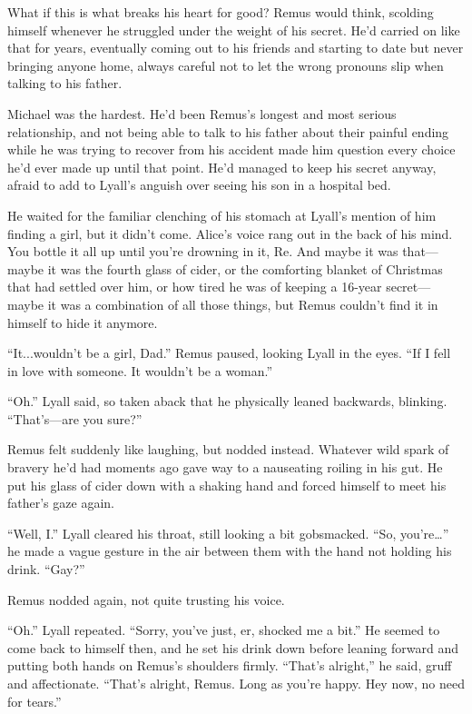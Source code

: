 What if this is what breaks his heart for good? Remus would think, scolding himself whenever he struggled under the weight of his secret. He’d carried on like that for years, eventually coming out to his friends and starting to date but never bringing anyone home, always careful not to let the wrong pronouns slip when talking to his father.

Michael was the hardest. He’d been Remus’s longest and most serious relationship, and not being able to talk to his father about their painful ending while he was trying to recover from his accident made him question every choice he’d ever made up until that point. He’d managed to keep his secret anyway, afraid to add to Lyall’s anguish over seeing his son in a hospital bed.

He waited for the familiar clenching of his stomach at Lyall’s mention of him finding a girl, but it didn’t come. Alice’s voice rang out in the back of his mind. You bottle it all up until you’re drowning in it, Re. And maybe it was that—maybe it was the fourth glass of cider, or the comforting blanket of Christmas that had settled over him, or how tired he was of keeping a 16-year secret—maybe it was a combination of all those things, but Remus couldn’t find it in himself to hide it anymore.

“It...wouldn’t be a girl, Dad.” Remus paused, looking Lyall in the eyes. “If I fell in love with someone. It wouldn’t be a woman.”

“Oh.” Lyall said, so taken aback that he physically leaned backwards, blinking. “That’s—are you sure?”

Remus felt suddenly like laughing, but nodded instead. Whatever wild spark of bravery he’d had moments ago gave way to a nauseating roiling in his gut. He put his glass of cider down with a shaking hand and forced himself to meet his father’s gaze again.

“Well, I.” Lyall cleared his throat, still looking a bit gobsmacked. “So, you’re…” he made a vague gesture in the air between them with the hand not holding his drink. “Gay?”

Remus nodded again, not quite trusting his voice.

“Oh.” Lyall repeated. “Sorry, you’ve just, er, shocked me a bit.” He seemed to come back to himself then, and he set his drink down before leaning forward and putting both hands on Remus’s shoulders firmly. “That’s alright,” he said, gruff and affectionate. “That’s alright, Remus. Long as you’re happy. Hey now, no need for tears.”

